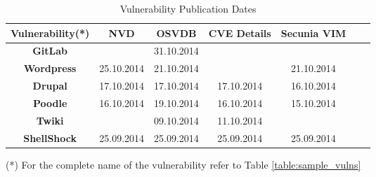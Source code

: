 \begin{table}
\begin{center}
    \begin{tabular}{ | c || c | c | c | c | c | c |}
    
    \hline
	
      Vulnerability(*) & \textbf{NVD}  &  \textbf{OSVDB} & \textbf{CVE Details} & \textbf{Secunia VIM} 
	\\ 
	\hline  
	\textbf{GitLab} & \multicolumn{1}{c|}{\cellcolor{red!25}} & \multicolumn{1}{c|}{\cellcolor{green!25} 31.10.2014} & \multicolumn{1}{c|}{\cellcolor{red!25}} & \multicolumn{1}{c|}{\cellcolor{red!25}} 
    \\ 
	\hline   
	 \textbf{Wordpress} & \multicolumn{1}{c|}{\cellcolor{yellow!25} 25.10.2014} & \multicolumn{1}{c|}{\cellcolor{green!25} 21.10.2014} & \multicolumn{1}{c|}{\cellcolor{red!25}} & \multicolumn{1}{c|}{\cellcolor{green!25} 21.10.2014} 
	  \\ 
	\hline
	 \textbf{Drupal} & \multicolumn{1}{c|}{\cellcolor{yellow!25}17.10.2014} & \multicolumn{1}{c|}{\cellcolor{yellow!25}17.10.2014} & \multicolumn{1}{c|}{\cellcolor{yellow!25}17.10.2014} & \multicolumn{1}{c|}{\cellcolor{green!25}16.10.2014}
	  \\ 
	\hline
	 \textbf{Poodle} & \multicolumn{1}{c|}{\cellcolor{yellow!25}16.10.2014} & \multicolumn{1}{c|}{\cellcolor{yellow!25}19.10.2014} & \multicolumn{1}{c|}{\cellcolor{yellow!25}16.10.2014} & \multicolumn{1}{c|}{\cellcolor{green!25}15.10.2014}
	  \\ 
	\hline 
	 \textbf{Twiki} & \multicolumn{1}{c|}{\cellcolor{red!25}} & \multicolumn{1}{c|}{\cellcolor{green!25} 09.10.2014} & \multicolumn{1}{c|}{\cellcolor{yellow!25} 11.10.2014} &\multicolumn{1}{c|}{\cellcolor{red!25}}
	  \\ 
	\hline 
	 \textbf{ShellShock} & \multicolumn{1}{c|}{\cellcolor{green!25}25.09.2014} & \multicolumn{1}{c|}{\cellcolor{green!25}25.09.2014} & \multicolumn{1}{c|}{\cellcolor{green!25}25.09.2014} &\multicolumn{1}{c|}{\cellcolor{green!25} 25.09.2014} 
	 \\
	 \hline
     
\end{tabular}
    \caption{Vulnerability Publication Dates}
    \label{table:source_speed}
    \footnotesize{(*) For the complete name of the vulnerability refer to Table \ref{table:sample_vulns}}
   \end{center}
    \end{table}


